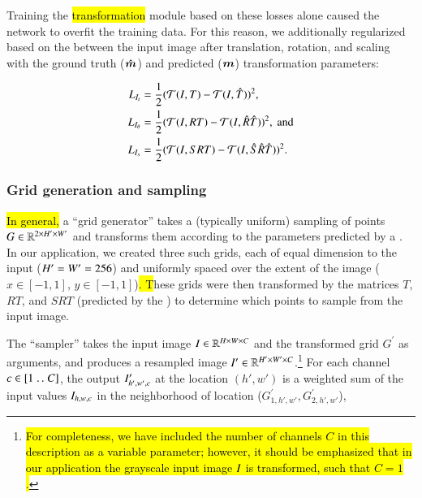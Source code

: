 Training the \hl{transformation} module based on these losses alone caused the network to overfit the training data.
For this reason, we additionally regularized based on the \MSE{} between the input image after translation, rotation, and scaling with the ground truth ($\hat{\bm{m}}$) and predicted ($\bm{m}$) transformation parameters:

\begin{align}
L_{I_t}      & = \frac{1}{2} (\mathcal{T}(I, T  ) - \mathcal{T}(I, \hat{T}  ))^2,                     \label{eqn:attn-image-loss-t} \\
L_{I_\theta} & = \frac{1}{2} (\mathcal{T}(I, RT ) - \mathcal{T}(I, \hat{R}\hat{T} ))^2, \mathrm{~and} \label{eqn:attn-image-loss-r} \\
L_{I_s}      & = \frac{1}{2} (\mathcal{T}(I, SRT) - \mathcal{T}(I, \hat{S}\hat{R}\hat{T}))^2.         \label{eqn:attn-image-loss-s}
\end{align}

\subsubsection{Grid generation and sampling}

\hl{In general,} a  ``grid generator'' takes a (typically uniform) sampling of points $G \in \mathbb{R}^{2 \times H' \times W'}$ and transforms them according to the parameters predicted by a \LocNet{}.
In our application, we created three such grids, each of equal dimension to the input ($H' = W' = 256$) and uniformly spaced over the extent of the image ($x \in [-1,1]$, $y \in [-1, 1]$)\hl{.
T}hese grids were then transformed by the matrices $T$, $RT$, and $SRT$ (predicted by the \LocNet{}) to determine which points to sample from the input image.

The ``sampler'' takes the input image $I \in \mathbb{R}^{H \times W \times C}$ and the transformed grid $G^\prime$ as arguments, and produces a resampled image $I^\prime \in \mathbb{R}^{H' \times W' \times C}$.\footnote{\hl{For completeness, we have included the number of channels $C$ in this description as a variable parameter; however, it should be emphasized that in our application the grayscale input image $I$ is transformed, such that $C = 1$.}}
For each channel $c \in [1 \mathrel{{.}\,{.}}\nobreak C ]$, the output $I^\prime_{h',w',c}$ at the location $(h',w')$ is a weighted sum of the input values $I_{h,w,c}$ in the neighborhood of location ($G^\prime_{1,h',w'}, G^\prime_{2,h',w'}$),


